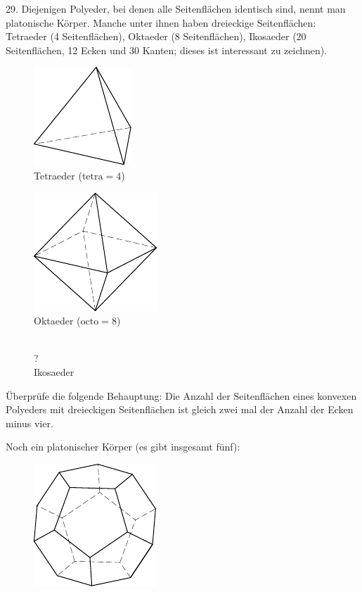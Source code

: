 \begin{problem}{29.}
	Diejenigen Polyeder, bei denen alle Seitenflächen identisch sind, nennt man platonische Körper. Manche unter ihnen haben dreieckige Seitenflächen: Tetraeder (4 Seitenflächen), Oktaeder (8 Seitenflächen), Ikosaeder (20 Seitenflächen, 12 Ecken und 30 Kanten; dieses ist interessant zu zeichnen).
	\begin{figure}
		\footnotesize
		\null\hfill
		\parbox{0.3\linewidth}{\centering\includegraphics{resources/taskbook-131}\\Tetraeder ($\text{tetra}= 4$)}
		\hfill
		\parbox{0.3\linewidth}{\centering\includegraphics{resources/taskbook-132}\\Oktaeder ($\text{octo}= 8$)}
		\hfill\null\\
		{\Huge ?}\\Ikosaeder
	\end{figure}
	Überprüfe die folgende Behauptung: Die Anzahl der Seitenflächen eines konvexen Polyeders mit dreieckigen Seitenflächen ist gleich zwei mal der Anzahl der Ecken minus vier.

	Noch ein platonischer Körper (es gibt insgesamt fünf):
	\begin{figure}
		\includegraphics{resources/taskbook-14}
	\end{figure}
\end{problem}

